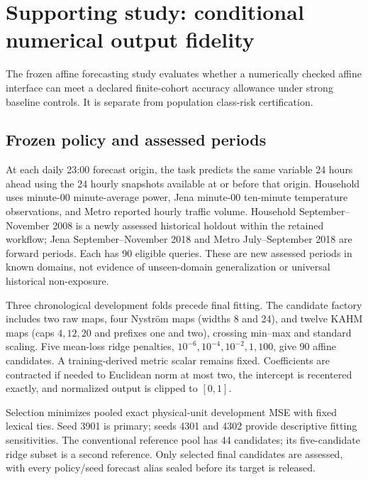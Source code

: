 \section{Supporting study: conditional numerical output fidelity}
\label{app:numerical}
The frozen affine forecasting study evaluates whether a numerically checked affine interface can meet a declared finite-cohort accuracy allowance under strong baseline controls. It is separate from population class-risk certification.

\subsection{Frozen policy and assessed periods}
At each daily 23:00 forecast origin, the task predicts the same variable 24 hours ahead using the 24 hourly snapshots available at or before that origin. Household uses minute-00 minute-average power, Jena minute-00 ten-minute temperature observations, and Metro reported hourly traffic volume. Household September--November 2008 is a newly assessed historical holdout within the retained workflow; Jena September--November 2018 and Metro July--September 2018 are forward periods. Each has 90 eligible queries. These are new assessed periods in known domains, not evidence of unseen-domain generalization or universal historical non-exposure.

Three chronological development folds precede final fitting. The candidate factory includes two raw maps, four Nystr\"om maps (widths 8 and 24), and twelve KAHM maps (caps $4,12,20$ and prefixes one and two), crossing min--max and standard scaling. Five mean-loss ridge penalties, $10^{-6},10^{-4},10^{-2},1,100$, give 90 affine candidates. A training-derived metric scalar remains fixed. Coefficients are contracted if needed to Euclidean norm at most two, the intercept is recentered exactly, and normalized output is clipped to $[0,1]$.

Selection minimizes pooled exact physical-unit development MSE with fixed lexical ties. Seed 3901 is primary; seeds 4301 and 4302 provide descriptive fitting sensitivities. The conventional reference pool has 44 candidates; its five-candidate ridge subset is a second reference. Only selected final candidates are assessed, with every policy/seed forecast alias sealed before its target is released.

